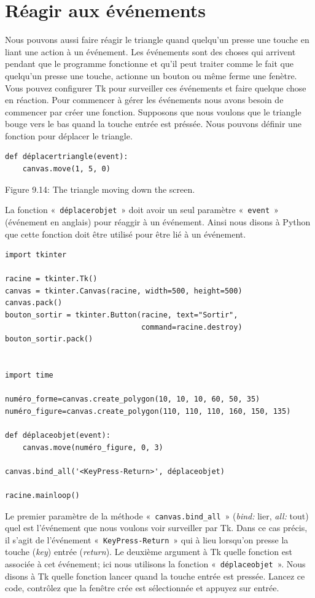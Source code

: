 \section{Réagir aux événements}
Nous pouvons aussi faire réagir le triangle quand quelqu'un presse une touche en liant une action à un événement. Les événements sont des choses qui arrivent pendant que le programme fonctionne et qu'il peut traiter comme le fait que quelqu'un presse une touche, actionne un bouton ou même ferme une fenètre. Vous pouvez configurer Tk pour surveiller ces événements et faire quelque chose en réaction. Pour commencer à gérer les événements nous avons besoin de commencer par créer une fonction. Supposons que nous voulons que le triangle bouge vers le bas quand la touche entrée est préssée. Nous pouvons définir une fonction pour déplacer le triangle.
\begin{Verbatim}[frame=single,rulecolor=\color{gray}, label=ne pas taper]
def déplacertriangle(event):
    canvas.move(1, 5, 0)
\end{Verbatim}


Figure 9.14: The triangle moving down the screen.


La fonction «~\texttt{déplacerobjet}~» doit avoir un seul paramètre «~\texttt{event}~» (événement en anglais) pour réaggir à un événement. Ainsi nous disons à Python que cette fonction doit être utilisé pour être lié à un événement.


\begin{Verbatim}[frame=single,rulecolor=\color{mbleu}, label=à taper]
import tkinter

racine = tkinter.Tk()
canvas = tkinter.Canvas(racine, width=500, height=500)
canvas.pack()
bouton_sortir = tkinter.Button(racine, text="Sortir",
                               command=racine.destroy)
bouton_sortir.pack()


import time

numéro_forme=canvas.create_polygon(10, 10, 10, 60, 50, 35)
numéro_figure=canvas.create_polygon(110, 110, 110, 160, 150, 135)

def déplaceobjet(event):
    canvas.move(numéro_figure, 0, 3)

canvas.bind_all('<KeyPress-Return>', déplaceobjet)

racine.mainloop()
\end{Verbatim}

Le premier paramètre de la méthode «~\texttt{canvas.bind\_all}~» (\emph{bind:} lier, \emph{all:} tout) quel est l'événement que nous voulons voir surveiller par Tk. Dans ce cas précis, il s'agit de l'événement «~\texttt{KeyPress-Return}~» qui à lieu lorsqu'on presse la touche (\emph{key}) entrée (\emph{return}). Le deuxième argument à Tk quelle fonction est associée à cet événement; ici nous utilisons la fonction  «~\texttt{déplaceobjet}~». Nous disons à Tk quelle fonction lancer quand la touche entrée est pressée. Lancez ce code, contrôlez que la fenêtre crée est sélectionnée et appuyez sur entrée.

